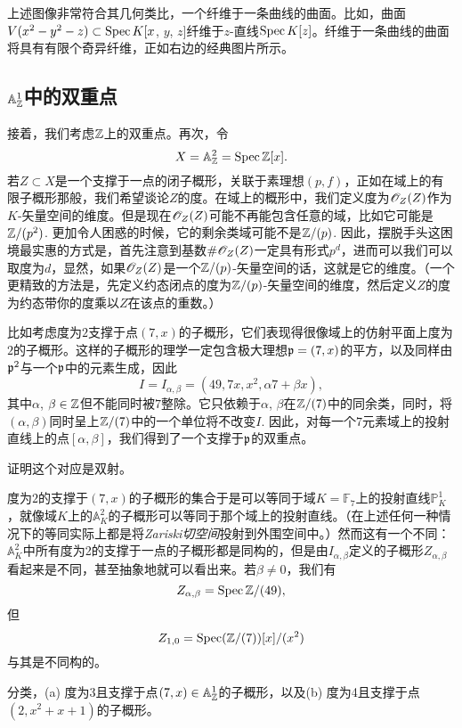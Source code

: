上述图像非常符合其几何类比，一个纤维于一条曲线的曲面。比如，曲面$V(x^2-y^2-z)\subset \operatorname{Spec} K[x$, $y$, $z]$纤维于$z$-直线$\operatorname{Spec} K[z]$。纤维于一条曲线的曲面将具有有限个奇异纤维，正如右边的经典图片所示。

\subsection{$\mathbb{A}_{\mathbb{Z}}^1$中的双重点}

接着，我们考虑$\mathbb{Z}$上的双重点。再次，令
\[
	X=\mathbb{A}_{\mathbb{Z}}^2=\operatorname{Spec}\mathbb{Z}[x].
\]
若$Z\subset X$是一个支撑于一点的闭子概形，关联于素理想$(p,f)$，正如在域上的有限子概形那般，我们希望谈论$Z$的度。在域上的概形中，我们定义度为$\mathscr{O}_Z(Z)$作为$K$-矢量空间的维度。但是现在$\mathscr{O}_Z(Z)$可能不再能包含任意的域，比如它可能是$\mathbb{Z}/(p^2)$. 更加令人困惑的时候，它的剩余类域可能不是$\mathbb{Z}/(p)$. 因此，摆脱手头这困境最实惠的方式是，首先注意到基数$\# \mathscr{O}_Z(Z)$一定具有形式$p^d$，进而可以我们可以取度为$d$，显然，如果$\mathscr{O}_Z(Z)$是一个$\mathbb{Z}/(p)$-矢量空间的话，这就是它的维度。（一个更精致的方法是，先定义约态闭点的度为$\mathbb{Z}/(p)$-矢量空间的维度，然后定义$Z$的度为约态带你的度乘以$Z$在该点的重数。）

比如考虑度为$2$支撑于点$(7,x)$的子概形，它们表现得很像域上的仿射平面上度为$2$的子概形。这样的子概形的理学一定包含极大理想$\mathfrak{p}=(7,x)$的平方，以及同样由$\mathfrak{p}^2$与一个$\mathfrak{p}$中的元素生成，因此
\[
	I=I_{\alpha,\beta}=(49,7x,x^2,\alpha 7+\beta x),
\]
其中$\alpha$, $\beta\in\mathbb{Z}$但不能同时被$7$整除。它只依赖于$\alpha$, $\beta$在$\mathbb{Z}/(7)$中的同余类，同时，将$(\alpha,\beta)$同时呈上$\mathbb{Z}/(7)$中的一个单位将不改变$I$. 因此，对每一个$7$元素域上的投射直线上的点$[\alpha,\beta]$，我们得到了一个支撑于$\mathfrak{p}$的双重点。

\begin{exe}
证明这个对应是双射。
\end{exe}

度为$2$的支撑于$(7,x)$的子概形的集合于是可以等同于域$K=\mathbb{F}_7$上的投射直线$\mathbb{P}_K^1$，就像域$K$上的$\mathbb{A}_K^2$的子概形可以等同于那个域上的投射直线。（在上述任何一种情况下的等同实际上都是将\textit{Zariski切空间}投射到外围空间中。\nottran）然而这有一个不同：$\mathbb{A}_K^2$中所有度为2的支撑于一点的子概形都是同构的，但是由$I_{\alpha,\beta}$定义的子概形$Z_{\alpha,\beta}$看起来是不同，甚至抽象地就可以看出来。若$\beta\neq 0$，我们有
\[
	Z_{\alpha,\beta}=\operatorname{Spec} \mathbb{Z}/(49),
\]
但
\[
	Z_{1,0}=\operatorname{Spec}(\mathbb{Z}/(7))[x]/(x^2)
\]
与其是不同构的。

\begin{exe}
分类，(a) 度为3且支撑于点$(7,x)\in\mathbb{A}_{\mathbb{Z}}^1$的子概形，以及(b) 度为4且支撑于点$(2,x^2+x+1)$的子概形。
\end{exe}

